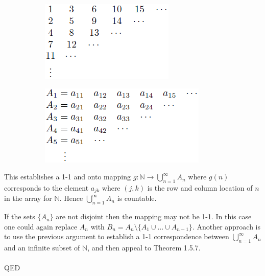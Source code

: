 \documentclass{article}
\begin{document}
            \begin{figure}[ht!]
                \centering
                \begin{subfigure}[b]{0.35\linewidth}
                    \includegraphics[width=\linewidth]{figs/theorem1.5.8(1).png}
                    \caption{}
                    \label{theorem1.5.8(1)}
                \end{subfigure}
                \begin{subfigure}[b]{0.45\linewidth}
                    \includegraphics[width=\linewidth]{figs/theorem1.5.8(2).png}
                    \caption{}
                    \label{theorem1.5.8(2)}
                \end{subfigure}
            \caption{}
            \end{figure}
            This establishes a 1-1 and onto mapping $g: \mathbb{N} \to \bigcup_{n=1}^\infty A_n$ where $g(n)$ corresponds to the element $a_{jk}$ where $(j,k)$ is the row and column location of $n$ in the array for $\mathbb{N}$. Hence $\bigcup_{n=1}^\infty A_n$ is countable.
            
            If the sets $\{A_n\}$ are not disjoint then the mapping may not be 1-1. In this case one could again replace $A_n$ with $B_n = A_n \setminus \{A_1 \cup \dots \cup A_{n-1}\}$. Another approach is to use the previous argument to establish a 1-1 correspondence between $\bigcup_{n=1}^\infty A_n$ and an infinite subset of $\mathbb{N}$, and then appeal to Theorem 1.5.7.\\ \\
            QED\\
            
\end{document}
